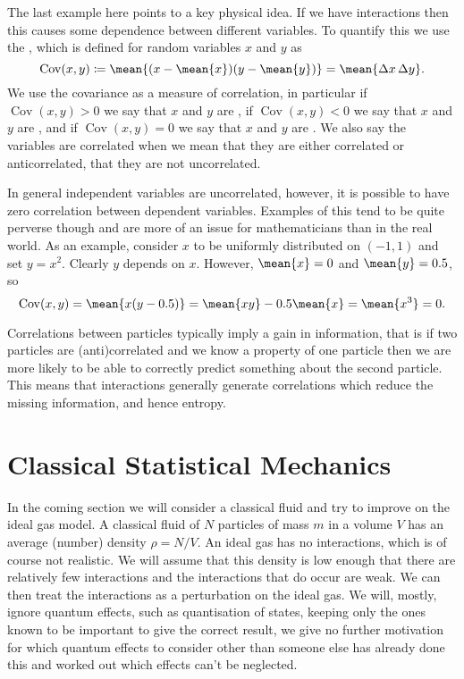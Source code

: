 \documentclass[fleqn]{NotesClass}
\DeclareMathOperator{\Cov}{Cov}
\begin{document}
    The last example here points to a key physical idea.
    If we have interactions then this causes some dependence between different variables.
    To quantify this we use the , which is defined for random variables \(x\) and \(y\) as
    \begin{equation}
        \Cov(x, y) \coloneqq \mean{(x - \mean{x})(y - \mean{y})} = \mean{\Delta x\, \Delta y}.
    \end{equation}
    We use the covariance as a measure of correlation, in particular if \(\Cov(x, y) > 0\) we say that \(x\) and \(y\) are , if \(\Cov(x, y) < 0\) we say that \(x\) and \(y\) are , and if \(\Cov(x, y) = 0\) we say that \(x\) and \(y\) are .
    We also say the variables are correlated when we mean that they are either correlated or anticorrelated, that they are not uncorrelated.
    
    In general independent variables are uncorrelated, however, it is possible to have zero correlation between dependent variables.
    Examples of this tend to be quite perverse though and are more of an issue for mathematicians than in the real world.
    As an example, consider \(x\) to be uniformly distributed on \((-1, 1)\) and set \(y = x^2\).
    Clearly \(y\) depends on \(x\).
    However, \(\mean{x} = 0\) and \(\mean{y} = 0.5\), so
    \begin{equation}
        \Cov(x, y) = \mean{x(y - 0.5)} = \mean{xy} - 0.5\mean{x} = \mean{x^3} = 0.
    \end{equation}
    
    Correlations between particles typically imply a gain in information, that is if two particles are (anti)correlated and we know a property of one particle then we are more likely to be able to correctly predict something about the second particle.
    This means that interactions generally generate correlations which reduce the missing information, and hence entropy.
    
    \section{Classical Statistical Mechanics}
    In the coming section we will consider a classical fluid and try to improve on the ideal gas model.
    A classical fluid of \(N\) particles of mass \(m\) in a volume \(V\) has an average (number) density \(\rho = N/V\).
    An ideal gas has no interactions, which is of course not realistic.
    We will assume that this density is low enough that there are relatively few interactions and the interactions that do occur are weak.
    We can then treat the interactions as a perturbation on the ideal gas.
    We will, mostly, ignore quantum effects, such as quantisation of states, keeping only the ones known to be important to give the correct result, we give no further motivation for which quantum effects to consider other than someone else has already done this and worked out which effects can't be neglected.
    
\end{document}
